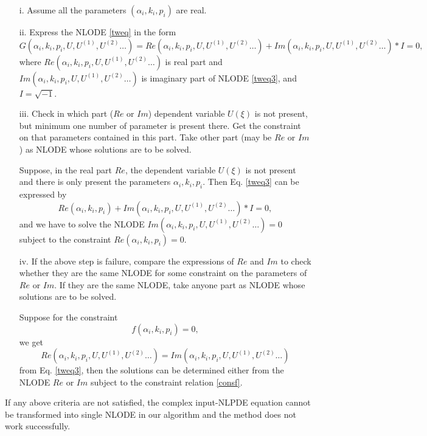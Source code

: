 \documentclass[prd,aps,floats,showkeys,nofootinbib,notitlepage]{revtex4-2}
\begin{document}
	\begin{itemize}
		\item[i.] Assume all the parameters $(\alpha_i,k_i,p_i)$ are real.
		\item[ii.] Express the NLODE \eqref{tweq} in the form 
		\begin{equation}\label{tweq3}
			G\left( {\alpha_i,k_i,p_i,U,U^{(1)},U^{(2)}} \ldots \right) = Re\left( {\alpha_i,k_i,p_i,U,U^{(1)},U^{(2)}} \ldots \right)+Im\left( {\alpha_i,k_i,p_i,U,U^{(1)},U^{(2)}} \ldots \right)*I=0,
		\end{equation}
		where $Re\left( {\alpha_i,k_i,p_i,U,U^{(1)},U^{(2)}} \ldots \right)$ is real part and $Im\left( {\alpha_i,k_i,p_i,U,U^{(1)},U^{(2)}} \ldots \right)$ is imaginary part of NLODE \eqref{tweq3}, and $I=\sqrt{-1}$.
		\item[iii.] Check in which part ($Re$ or $Im$) dependent variable $U(\xi)$ is not present, but minimum one number of parameter is present there. Get the constraint on that parameters contained in this part. Take other part (may be $Re$ or $Im$) as NLODE whose solutions are to be solved. 
		\par Suppose, in the real part $Re$, the dependent variable $U(\xi)$ is not present and there is only present the parameters $\alpha_i,k_i,p_i$. Then Eq. \eqref{tweq3} can be expressed by 
		\begin{equation}
			Re\left( {\alpha_i,k_i,p_i} \right)+Im\left( {\alpha_i,k_i,p_i,U,U^{(1)},U^{(2)}} \ldots \right)*I=0,
		\end{equation}
		and we have to solve the NLODE $Im\left( {\alpha_i,k_i,p_i,U,U^{(1)},U^{(2)}} \ldots \right)=0$ subject to the constraint $Re\left( {\alpha_i,k_i,p_i}\right)=0$.
		\item[iv.] If the above step is failure, compare the expressions of $Re$ and $Im$ to check whether they are the same NLODE for some constraint on the parameters of $Re$ or $Im$. If they are the same NLODE, take anyone part as NLODE whose solutions are to be solved.
		\par Suppose for the constraint 
		\begin{equation}\label{consf}
			f(\alpha_i,k_i,p_i)=0,
		\end{equation}
		we get
		\begin{equation}\label{reEqIm}
			Re\left( {\alpha_i,k_i,p_i,U,U^{(1)},U^{(2)}} \ldots \right)=Im\left( {\alpha_i,k_i,p_i,U,U^{(1)},U^{(2)}} \ldots \right)
		\end{equation}
		from Eq. \eqref{tweq3}, then the solutions can be determined either from the NLODE $Re$ or $Im$ subject to the constraint relation \eqref{consf}. 
	\end{itemize}
	If any above criteria are not satisfied, the complex input-NLPDE equation cannot be transformed into single NLODE in our algorithm and the method does not work
	successfully.\\
	
\end{document}
